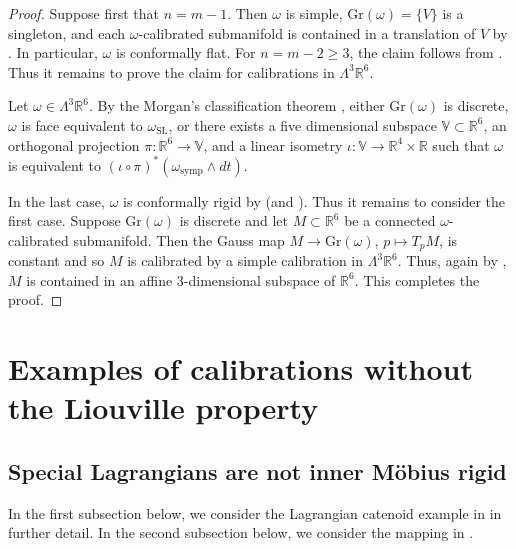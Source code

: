 \documentclass[a4paper,leqno,11pt]{amsart}
\numberwithin{equation}{section}
\theoremstyle{remark}
\theoremstyle{remark}
\newcommand{\R}{\mathbb{R}}
\newcommand{\symp}{\mathrm{symp}}
\newcommand{\Gr}{\mathrm{Gr}}
\newcommand{\SL}{\mathrm{SL}}
\begin{document}
\classification*
\begin{proof}
Suppose first that $n=m-1$. Then $\omega$ is simple, $\Gr(\omega) = \{V\}$ is a singleton, and each $\omega$-calibrated submanifold is contained in a translation of $V$ by . In particular, $\omega$ is conformally flat. For $n=m-2 \geq 3$, the claim follows from . Thus it remains to prove the claim for calibrations in $\Lambda^3 \R^6$. 

Let $\omega \in \Lambda^3 \R^6$. By the Morgan's classification theorem \cite[Theorem 4.8]{Mor:85}, either $\Gr(\omega)$ is discrete, $\omega$ is face equivalent to $\omega_\SL$, or there exists a five dimensional subspace $\mathbb{V} \subset \mathbb{R}^6$, an orthogonal projection $\pi \colon \mathbb{R}^6 \rightarrow \mathbb{V}$, and a linear isometry $\iota \colon \mathbb{V} \rightarrow \mathbb{R}^4 \times \mathbb{R}$ such that $\omega$ is equivalent to $( \iota \circ \pi )^{*}( \omega_{\symp} \wedge dt )$.  

In the last case, $\omega$ is conformally rigid by  (and ). Thus it remains to consider the first case. Suppose $\Gr(\omega)$ is discrete and let $M \subset \R^6$ be a connected $\omega$-calibrated submanifold. Then the Gauss map $M \to \Gr(\omega)$, $p \mapsto T_p M$, is constant and so $M$ is calibrated by a simple calibration in $\Lambda^3 \R^6$. Thus, again by , $M$ is contained in an affine $3$-dimensional subspace of $\R^6$. This completes the proof.
\end{proof}









\section{Examples of calibrations without the Liouville property}
\label{sec:examples}

\subsection{Special Lagrangians are not inner M\"obius rigid}
\label{sec:Special-Lagrangians}
In the first subsection below, we consider the Lagrangian catenoid example in  in further detail. In the second subsection below, we consider the mapping in .
\end{document}
